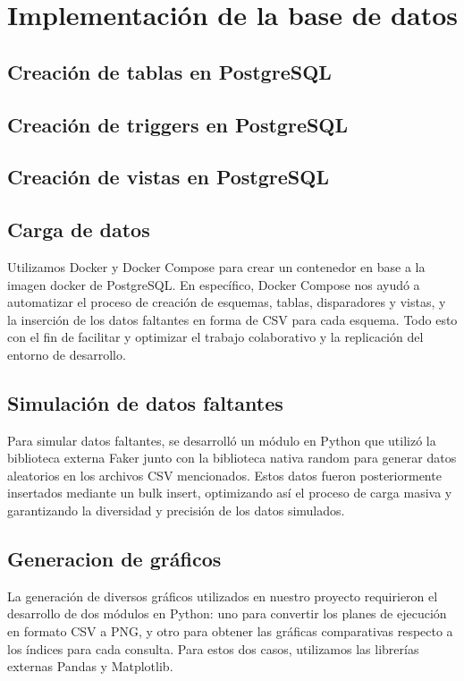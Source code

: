 \section{Implementación de la base de datos}
\subsection{Creación de tablas en PostgreSQL}

\subsection{Creación de triggers en PostgreSQL}

\subsection{Creación de vistas en PostgreSQL}

\subsection{Carga de datos}
Utilizamos Docker y Docker Compose para crear un contenedor en base a la imagen docker de PostgreSQL. En específico, Docker Compose nos ayudó a automatizar el proceso de creación de esquemas, tablas, disparadores y vistas, y la inserción de los datos faltantes en forma de CSV para cada esquema. Todo esto con el fin de facilitar y optimizar el trabajo colaborativo y la replicación del entorno de desarrollo.
\subsection{Simulación de datos faltantes}
Para simular datos faltantes, se desarrolló un módulo en Python que utilizó la biblioteca externa Faker junto con la biblioteca nativa random para generar datos aleatorios en los archivos CSV mencionados. Estos datos fueron posteriormente insertados mediante un bulk insert, optimizando así el proceso de carga masiva y garantizando la diversidad y precisión de los datos simulados.
\subsection{Generacion de gráficos}
La generación de diversos gráficos utilizados en nuestro proyecto requirieron el desarrollo de dos módulos en Python: uno para convertir los planes de ejecución en formato CSV a PNG, y otro para obtener las gráficas comparativas respecto a los índices para cada consulta. Para estos dos casos, utilizamos las librerías externas Pandas y Matplotlib.